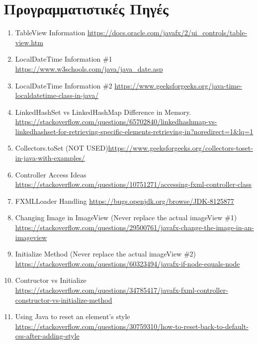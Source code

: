     \section{Προγραμματιστικές Πηγές}
    \label{sec:SectionName3.3}
    \begin{enumerate}
        \item TableView Information \url{https://docs.oracle.com/javafx/2/ui_controls/table-view.htm}

        \item LocalDateTime Information \#1 \url{https://www.w3schools.com/java/java_date.asp}
        
        \item LocalDateTime Information \#2 \url{https://www.geeksforgeeks.org/java-time-localdatetime-class-in-java/}
        
        \item LinkedHashSet vs LinkedHashMap Difference in Memory. \url{https://stackoverflow.com/questions/65702840/linkedhashmap-vs-linkedhashset-for-retrieving-specific-elements-retrieving-in?noredirect=1&lq=1}
        
        \item Collectors.toSet (NOT USED)\url{https://www.geeksforgeeks.org/collectors-toset-in-java-with-examples/}
        
        \item Controller Access Ideas \url{https://stackoverflow.com/questions/10751271/accessing-fxml-controller-class}
        
        \item FXMLLoader Handling \url{https://bugs.openjdk.org/browse/JDK-8125877}
        
        
        \item Changing Image in ImageView (Never replace the actual imageView \#1) \url{https://stackoverflow.com/questions/29500761/javafx-change-the-image-in-an-imageview}
        
        \item Initialize Method (Never replace the actual imageView \#2) \url{https://stackoverflow.com/questions/60323494/javafx-if-node-equals-node}
        
        \item Contructor vs Initialize \url{https://stackoverflow.com/questions/34785417/javafx-fxml-controller-constructor-vs-initialize-method}
        
        \item Using Java to reset an element's style \url{https://stackoverflow.com/questions/30759310/how-to-reset-back-to-default-css-after-adding-style}
        

\end{enumerate}
